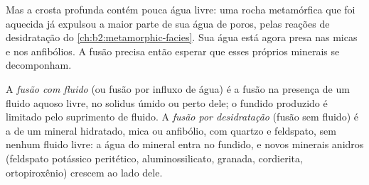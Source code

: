 \begin{omfigure}
\centering
{}
\par{}
\end{omfigure}

Mas a crosta profunda contém pouca água livre: uma rocha metamórfica que foi aquecida já
expulsou a maior parte de sua água de poros, pelas reações de desidratação do
\cref{ch:b2:metamorphic-facies}. Sua água está agora presa nas micas e nos anfibólios. A fusão
precisa então esperar que esses próprios minerais se decomponham.

\begin{definition}\label{def:b2:crustal-melting:reactions}
A \emph{fusão com fluido} (ou fusão por influxo de água) é a
fusão na presença de um fluido aquoso livre, no solidus úmido ou perto dele; o fundido
produzido é limitado pelo suprimento de fluido. A \emph{fusão por desidratação}
(fusão sem fluido) é a  de um mineral hidratado, mica ou
anfibólio, com quartzo e feldspato, sem nenhum fluido livre: a água do mineral
entra no fundido, e novos minerais anidros (feldspato potássico peritético, aluminossilicato,
granada, cordierita, ortopiroxênio) crescem ao lado dele.
\end{definition}

